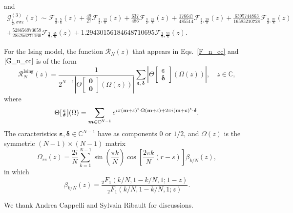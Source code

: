 \documentclass[a4paper,11pt]{article}
\def\chartheta#1#2{\Theta\!\left[\begin{smallmatrix}#1\\#2\end{smallmatrix}\right]\!}
\begin{document}
and
\begin{multline}
 \mathcal{G}_{\frac{1}{2},\sigma\sigma\varepsilon}^{(3)}(z)\sim
 \mathcal{F}_{\frac{3}{2}, \frac{5}{8}}(z) + 
 \frac{49}{27}\mathcal{F}_{\frac{3}{2}, \frac{13}{8}}(z) + 
 \frac{637}{486}\mathcal{F}_{\frac{3}{2}, \frac{21}{8}}(z) + 
 \frac{176647}{485514}\mathcal{F}_{\frac{3}{2}, \frac{29}{8}}(z) + 
 \frac{6395744863}{16585210728}\mathcal{F}_{\frac{3}{2}, \frac{37}{8}}(z) \\ + 
 \frac{528656973059}{285256271160}\mathcal{F}_{\frac{3}{2}, \frac{45}{8}}(z) + 
 1.29430156184648710695\mathcal{F}_{\frac{3}{2}, \frac{53}{8}}(z).
\end{multline}

For the Ising model, the function $\mathcal{R}_N(z)$ that appears in Eqs.~\eqref{F_n_cc}
and $\eqref{G_n_cc}$ is of the form
\begin{equation}\label{R_n_ising}
\mathcal{R}_N^{\text{Ising}}(z)=\frac{1}{2^{N-1}|\chartheta{\boldsymbol{0}}{\boldsymbol{0}}(\Omega(z))|}
\sum_{\boldsymbol{\varepsilon},\boldsymbol{\delta}}
\left|\chartheta{\boldsymbol{\varepsilon}}{\boldsymbol{\delta}} (\Omega(z))\right|,\quad z\in\mathbb{C},
\end{equation}
where
$$\chartheta{\boldsymbol{\varepsilon}}{\boldsymbol{\delta}} (\Omega)=
\sum_{\boldsymbol{m}\in\mathbb{C}^{N-1}}
e^{i\pi({\bf m}+{\bf \varepsilon})^t
\cdot \Omega({\bf m}+{\bf \varepsilon})+2\pi i 
({\bf m}+\boldsymbol{\varepsilon})^t\cdot \boldsymbol{\delta}}.
$$
The caracteristics $\boldsymbol{\varepsilon},\boldsymbol{\delta}\in\mathbb{C}^{N-1}$
have as components $0$ or $1/2$, and $\Omega(z)$ is the symmetric $(N-1)\times (N-1)$
matrix 
\begin{equation}\label{period_matrix}
\Omega_{rs}(z)=\frac{2 i}{N}\sum_{k=1}^{N-1}\sin\left(\frac{\pi k}{N}\right)
\cos\left[\frac{2\pi k}{N}(r-s)\right]\beta_{k/N}(z),
\end{equation}
in which
$$\beta_{k/N}(z)=\frac{_2F_1(k/N, 1-k/N, 1; 1-z)}{_2F_1(k/N, 1-k/N, 1; z)}.$$

\acknowledgments
We thank Andrea Cappelli and Sylvain Ribault for discussions.





\end{document}

